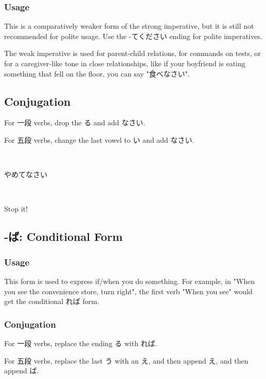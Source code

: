 \documentclass{article}
\begin{document}
\begin{CJK}{UTF8}{min}
\subsubsection{Usage}

This is a comparatively weaker form of the strong imperative, but it is still not recommended for polite usage. Use the -てください ending for polite imperatives. 

The weak imperative is used for parent-child relations, for commands on tests, or for a caregiver-like tone in close relationships, like if your boyfriend is eating something that fell on the floor, you can say "食べなさい".

\subsection{Conjugation}

For 一段 verbs, drop the る and add なさい. 

For 五段 verbs, change the last vowel to い and add なさい.

\begin{example}
\ 

やめてなさい
\end{example}

\begin{solution}
\ 

Stop it!
\end{solution}

\subsection{-ば: Conditional Form}

\subsubsection{Usage}

This form is used to express if/when you do something. For example, in "When you see the convenience store, turn right", the first verb "When you see" would get the conditional れば form.

\subsubsection{Conjugation}

For 一段 verbs, replace the ending る with れば.

For 五段 verbs, replace the last う with an え, and then append え, and then append ば.


\end{CJK}
\end{document}
